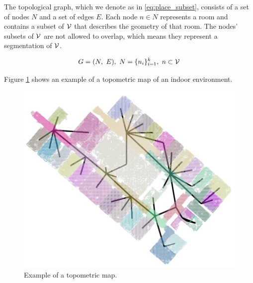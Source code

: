 The topological graph, which we denote as in \ref{eq:place_subset}, consists of a set of nodes \(N\) and a set of edges \(E\). Each node \(n \in N\) represents a room and contains a subset of \(\mathcal{V}\) that describes the geometry of that room. The nodes' subsets of \(\mathcal{V}\) are not allowed to overlap, which means they represent a segmentation of \(\mathcal{V}\).

\begin{equation}
    \label{eq:place_subset}
    G=(N,\ E),\ N=\{n_i\}_{i=1}^k,\ n \subset \mathcal{V}
\end{equation}

Figure \ref{fig:topometricmap} shows an example of a topometric map of an indoor environment.

\begin{figure}[h]
    \centering
    \includegraphics*[width=.7\textwidth]{./fig/area_1_topo_01.png}
    \caption{Example of a topometric map.}
    \label{fig:topometricmap}
\end{figure}


